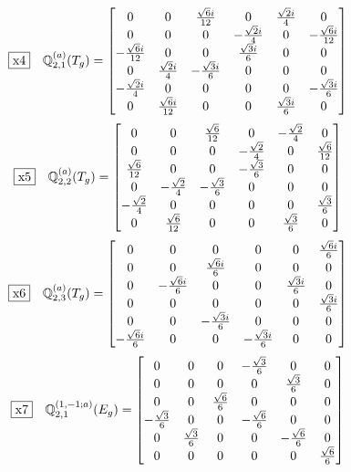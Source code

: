 \documentclass[fleqn,10pt,landscape]{jsarticle}
\begin{document}
\begin{dmath*}
\fbox{x4}\quad \mathbb{Q}_{2,1}^{(a)}(T_{g})=\begin{bmatrix} 0 & 0 & \frac{\sqrt{6} i}{12} & 0 & \frac{\sqrt{2} i}{4} & 0 \\ 0 & 0 & 0 & - \frac{\sqrt{2} i}{4} & 0 & - \frac{\sqrt{6} i}{12} \\ - \frac{\sqrt{6} i}{12} & 0 & 0 & \frac{\sqrt{3} i}{6} & 0 & 0 \\ 0 & \frac{\sqrt{2} i}{4} & - \frac{\sqrt{3} i}{6} & 0 & 0 & 0 \\ - \frac{\sqrt{2} i}{4} & 0 & 0 & 0 & 0 & - \frac{\sqrt{3} i}{6} \\ 0 & \frac{\sqrt{6} i}{12} & 0 & 0 & \frac{\sqrt{3} i}{6} & 0 \end{bmatrix}
\end{dmath*}
\begin{dmath*}
\fbox{x5}\quad \mathbb{Q}_{2,2}^{(a)}(T_{g})=\begin{bmatrix} 0 & 0 & \frac{\sqrt{6}}{12} & 0 & - \frac{\sqrt{2}}{4} & 0 \\ 0 & 0 & 0 & - \frac{\sqrt{2}}{4} & 0 & \frac{\sqrt{6}}{12} \\ \frac{\sqrt{6}}{12} & 0 & 0 & - \frac{\sqrt{3}}{6} & 0 & 0 \\ 0 & - \frac{\sqrt{2}}{4} & - \frac{\sqrt{3}}{6} & 0 & 0 & 0 \\ - \frac{\sqrt{2}}{4} & 0 & 0 & 0 & 0 & \frac{\sqrt{3}}{6} \\ 0 & \frac{\sqrt{6}}{12} & 0 & 0 & \frac{\sqrt{3}}{6} & 0 \end{bmatrix}
\end{dmath*}
\begin{dmath*}
\fbox{x6}\quad \mathbb{Q}_{2,3}^{(a)}(T_{g})=\begin{bmatrix} 0 & 0 & 0 & 0 & 0 & \frac{\sqrt{6} i}{6} \\ 0 & 0 & \frac{\sqrt{6} i}{6} & 0 & 0 & 0 \\ 0 & - \frac{\sqrt{6} i}{6} & 0 & 0 & \frac{\sqrt{3} i}{6} & 0 \\ 0 & 0 & 0 & 0 & 0 & \frac{\sqrt{3} i}{6} \\ 0 & 0 & - \frac{\sqrt{3} i}{6} & 0 & 0 & 0 \\ - \frac{\sqrt{6} i}{6} & 0 & 0 & - \frac{\sqrt{3} i}{6} & 0 & 0 \end{bmatrix}
\end{dmath*}
\begin{dmath*}
\fbox{x7}\quad \mathbb{Q}_{2,1}^{(1,-1;a)}(E_{g})=\begin{bmatrix} 0 & 0 & 0 & - \frac{\sqrt{3}}{6} & 0 & 0 \\ 0 & 0 & 0 & 0 & \frac{\sqrt{3}}{6} & 0 \\ 0 & 0 & \frac{\sqrt{6}}{6} & 0 & 0 & 0 \\ - \frac{\sqrt{3}}{6} & 0 & 0 & - \frac{\sqrt{6}}{6} & 0 & 0 \\ 0 & \frac{\sqrt{3}}{6} & 0 & 0 & - \frac{\sqrt{6}}{6} & 0 \\ 0 & 0 & 0 & 0 & 0 & \frac{\sqrt{6}}{6} \end{bmatrix}
\end{dmath*}
\end{document}
